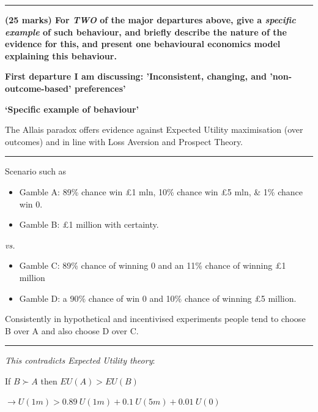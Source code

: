 \documentclass[]{article}
\begin{document}
\begin{center}\rule{0.5\linewidth}{\linethickness}\end{center}

\textbf{(25 marks) For \textit{TWO} of the major departures above, give a \textit{specific example} of such behaviour, and briefly describe the nature of the evidence for this, and present one behavioural economics model explaining this behaviour.}

\textbf{First departure I am discussing: 'Inconsistent, changing, and 'non-outcome-based' preferences'}

\bigskip

\textbf{`Specific example of behaviour'}

The Allais paradox offers evidence against Expected Utility maximisation (over outcomes) and in line with Loss Aversion and Prospect Theory.

\begin{center}\rule{0.5\linewidth}{\linethickness}\end{center}

Scenario such as

\begin{itemize}
\item
  Gamble A: 89\% chance win \pounds 1 mln, 10\% chance win \pounds 5 mln, \& 1\% chance win 0.
\item
  Gamble B: \pounds1 million with certainty.
\end{itemize}

\textit{vs.}

\begin{itemize}
\item
  Gamble C: 89\% chance of winning 0 and an 11\% chance of winning \pounds1 million
\item
  Gamble D: a 90\% chance of win 0 and 10\% chance of winning \pounds5 million.
\end{itemize}

Consistently in hypothetical and incentivised experiments people tend to choose B over A and also choose D over C.

\begin{center}\rule{0.5\linewidth}{\linethickness}\end{center}

\textit{This contradicts Expected Utility theory}:

If \(B \succ A\) then \(EU(A) > EU(B)\)

\(\rightarrow U(1m) > 0.89 \: U(1m) + 0.1 \: U(5m) + 0.01 \: U(0)\)
\end{document}
